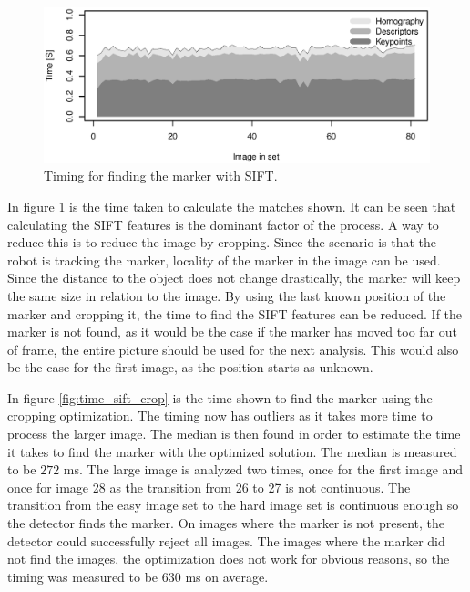 \begin{figure}[h]
 \centering
 \includegraphics[width=\fullImageWidth]{graphics/marker3_timing_unoptimized}
 \caption{Timing for finding the marker with SIFT.}
 \label{fig:time_sift_unoptimized}
\end{figure}

In figure \ref{fig:time_sift_unoptimized} is the time taken to calculate the matches shown.
It can be seen that calculating the SIFT features is the dominant factor of the process.
A way to reduce this is to reduce the image by cropping.
Since the scenario is that the robot is tracking the marker, locality of the marker in the image can be used.
Since the distance to the object does not change drastically, the marker will keep the same size in relation to the image.
By using the last known position of the marker and cropping it, the time to find the SIFT features can be reduced.
If the marker is not found, as it would be the case if the marker has moved too far out of frame, the entire picture should be used for the next analysis.
This would also be the case for the first image, as the position starts as unknown.

In figure \ref{fig:time_sift_crop} is the time shown to find the marker using the cropping optimization.
The timing now has outliers as it takes more time to process the larger image.
The median is then found in order to estimate the time it takes to find the marker with the optimized solution.
The median is measured to be $272$ ms.
The large image is analyzed two times, once for the first image and once for image 28 as the transition from 26 to 27 is not continuous.
The transition from the easy image set to the hard image set is continuous enough so the detector finds the marker.
On images where the marker is not present, the detector could successfully reject all images.
The images where the marker did not find the images, the optimization does not work for obvious reasons, so the timing was measured to be $630$ ms on average.


